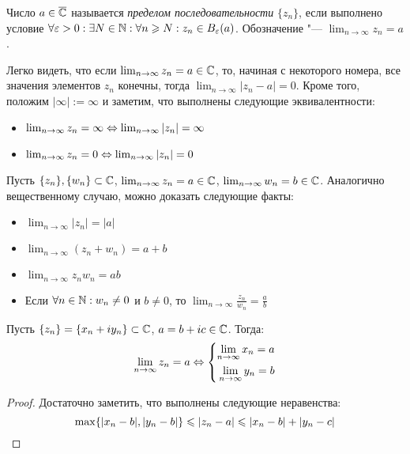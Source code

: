 \begin{definition}
	Число $a \in \overline\Cm$ называется \textit{пределом последовательности} $\{z_n\}$, если выполнено условие $\forall \epsilon > 0 : \exists N \in \N: \forall n \ge N: z_n \in B_{\epsilon}(a)$. Обозначение "--- $\lim_{n \to \infty}z_n = a$.
\end{definition}

\begin{note}
	Легко видеть, что если $\lim_{n \to \infty}z_n = a \in \Cm$, то, начиная с некоторого номера, все значения элементов $z_n$ конечны, тогда $\lim_{n \to \infty}|z_n - a| = 0$. Кроме того, положим $|\infty| := \infty$ и заметим, что выполнены следующие эквивалентности:
	\begin{itemize}
		\item $\lim_{n \to \infty}z_n = \infty \lra \lim_{n \to \infty}|z_n| = \infty$
		\item $\lim_{n \to \infty}z_n = 0 \lra \lim_{n \to \infty}|z_n| = 0$
	\end{itemize}
\end{note}

\begin{note}
	Пусть $\{z_n\}, \{w_n\} \subset \Cm$, $\lim_{n \to \infty}z_n = a \in \Cm$, $\lim_{n \to \infty}w_n = b \in \Cm$. Аналогично вещественному случаю, можно доказать следующие факты:
	\begin{itemize}
		\item $\lim_{n \to \infty}|z_n| = |a|$
		\item $\lim_{n \to \infty}(z_n+w_n) = a+b$
		\item $\lim_{n \to \infty}z_nw_n = ab$
		\item Если $\forall n \in \N: w_n \ne 0$ и $b \ne 0$, то $\lim_{n \to \infty}\frac{z_n}{w_n} = \frac ab$
	\end{itemize}
\end{note}

\begin{proposition}
	Пусть $\{z_n\} = \{x_n + iy_n\} \subset \Cm$, $a = b+ic \in \Cm$. Тогда:
	\[\lim_{n \to \infty}z_n = a \lra \System{
		\lim_{n \to \infty}x_n = a\\
		\lim_{n \to \infty}y_n = b
	}\]
\end{proposition}

\begin{proof}
	Достаточно заметить, что выполнены следующие неравенства:
	\[\max\{|x_n - b|, |y_n - b|\} \le |z_n - a| \le |x_n - b| + |y_n - c|\qedhere\]
\end{proof}

